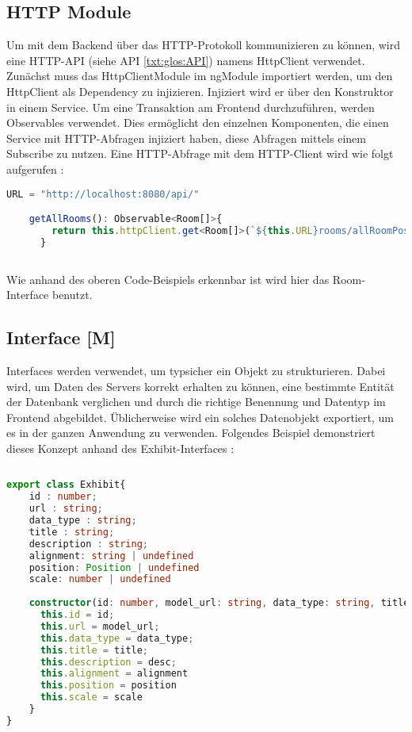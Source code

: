 \subsection{HTTP Module}
Um mit dem Backend über das HTTP-Protokoll kommunizieren zu können, wird eine HTTP-API (siehe API \ref{txt:glos:API}) namens HttpClient verwendet. Zunächst muss das HttpClientModule im ngModule importiert werden, um den HttpClient als Dependency zu injizieren. Injiziert wird er über den Konstruktor in einem Service. Um eine Transaktion am Frontend durchzuführen, werden Observables verwendet. Dies ermöglicht den einzelnen Komponenten, die einen Service mit HTTP-Abfragen injiziert haben, diese Abfragen mittels einem Subscribe zu nutzen. Eine HTTP-Abfrage mit dem HTTP-Client wird wie folgt aufgerufen \cite{AngularBuch} \cite{AngularHTTPClient}:

\begin{lstlisting}[caption={HttpClient Abfragen},  language=TypeScript,label=lst:impl:httpclientrequests]   
    URL = "http://localhost:8080/api/"

    getAllRooms(): Observable<Room[]>{
        return this.httpClient.get<Room[]>(`${this.URL}rooms/allRoomPositions`);
      }
    
\end{lstlisting}

Wie anhand des oberen Code-Beispiels erkennbar ist wird hier das Room-Interface benutzt.

\subsection{Interface [M]}
\label{interface}
Interfaces werden verwendet, um typsicher ein Objekt zu strukturieren. Dabei wird, um Daten des Servers korrekt erhalten zu können, eine bestimmte Entität der Datenbank verglichen und durch die richtige Benennung und Datentyp im Frontend abgebildet. Üblicherweise wird ein solches Datenobjekt exportiert, um es in der ganzen Anwendung zu verwenden. Folgendes Beispiel demonstriert dieses Konzept anhand des Exhibit-Interfaces \cite{AngularBuch}: 

\begin{lstlisting}[caption={Das Datenmodell eines Ausstelungsstückes},  language=TypeScript,label=lst:impl:httpclientrequests]   
  
export class Exhibit{
    id : number;
    url : string;
    data_type : string;
    title : string;
    description : string;
    alignment: string | undefined
    position: Position | undefined
    scale: number | undefined
  
    constructor(id: number, model_url: string, data_type: string, title: string, desc: string, alignment: string | undefined, position: Position | undefined, scale: number | undefined) {
      this.id = id;
      this.url = model_url;
      this.data_type = data_type;
      this.title = title;
      this.description = desc;
      this.alignment = alignment
      this.position = position
      this.scale = scale
    }
}
\end{lstlisting}

